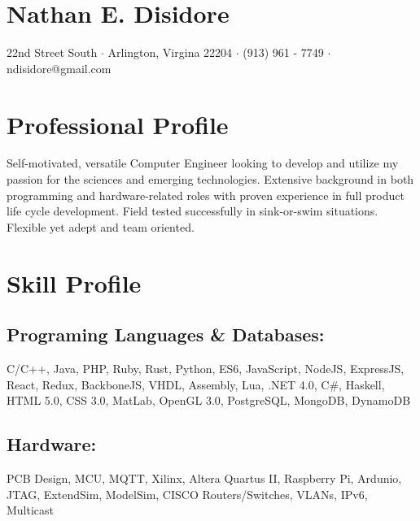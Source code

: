 \documentclass[10pt]{extarticle}
\newcommand{\startsquarepar}{\par\begingroup \parfillskip 0pt \relax}
\newcommand{\stopsquarepar}{\par\endgroup}
\begin{document}
\pagestyle{empty} %

\section*{\Huge Nathan E. Disidore}
\startsquarepar
  3429 22nd Street South $\cdot$ Arlington, Virgina 22204 $\cdot$ (913) 961 - 7749 $\cdot$ ndisidore@gmail.com
\stopsquarepar

\section*{Professional Profile}
Self-motivated, versatile Computer Engineer looking to develop and utilize my passion for the sciences and emerging technologies. Extensive background in both programming and hardware-related roles with proven experience in full product life cycle development. Field tested successfully in sink-or-swim situations. Flexible yet adept and team oriented.

\section*{Skill Profile}
\subsection*{Programing Languages \& Databases:}
C/C++, Java, PHP, Ruby, Rust, Python, ES6, JavaScript, NodeJS, ExpressJS, React, Redux, BackboneJS, VHDL, Assembly, Lua, .NET 4.0, C\#, Haskell, HTML 5.0, CSS 3.0, MatLab, OpenGL 3.0, PostgreSQL, MongoDB, DynamoDB
\subsection*{Hardware:}
PCB Design, MCU, MQTT, Xilinx, Altera Quartus II, Raspberry Pi, Ardunio, JTAG, ExtendSim, ModelSim, CISCO Routers/Switches, VLANs, IPv6, Multicast
\end{document}
